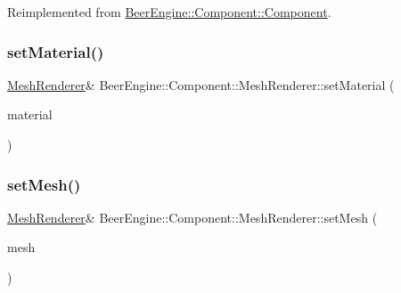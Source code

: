 Reimplemented from \mbox{\hyperlink{class_beer_engine_1_1_component_1_1_component_a4d82d8a6b22b93514e0585fa4073041f}{Beer\+Engine\+::\+Component\+::\+Component}}.

\mbox{\label{class_beer_engine_1_1_component_1_1_mesh_renderer_a9d4408a8c5e670c130394c59eeb5ccf2}} 
\subsubsection{\texorpdfstring{set\+Material()}{setMaterial()}}
{\footnotesize\ttfamily \mbox{\hyperlink{class_beer_engine_1_1_component_1_1_mesh_renderer}{Mesh\+Renderer}}\& Beer\+Engine\+::\+Component\+::\+Mesh\+Renderer\+::set\+Material (\begin{DoxyParamCaption}\item[{\mbox{\hyperlink{class_beer_engine_1_1_graphics_1_1_a_material}{Graphics\+::\+A\+Material}} $\ast$}]{material }\end{DoxyParamCaption})}

\mbox{\label{class_beer_engine_1_1_component_1_1_mesh_renderer_a818276a7fe8703a04bf431a41fa4c907}} 
\subsubsection{\texorpdfstring{set\+Mesh()}{setMesh()}\hspace{0.1cm}{\footnotesize\ttfamily [1/2]}}
{\footnotesize\ttfamily \mbox{\hyperlink{class_beer_engine_1_1_component_1_1_mesh_renderer}{Mesh\+Renderer}}\& Beer\+Engine\+::\+Component\+::\+Mesh\+Renderer\+::set\+Mesh (\begin{DoxyParamCaption}\item[{\mbox{\hyperlink{class_beer_engine_1_1_graphics_1_1_mesh}{Graphics\+::\+Mesh}} $\ast$}]{mesh }\end{DoxyParamCaption})}

